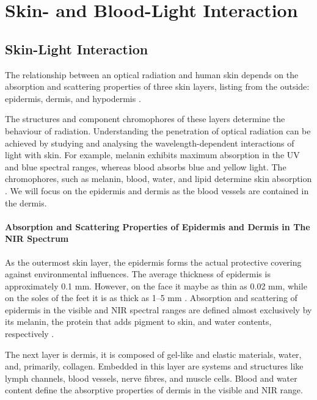 
\chapter{Skin- and Blood-Light Interaction}\label{chapter:Skin- and Blood-Light Interaction}


\section{Skin-Light Interaction}

The relationship between an optical radiation and human skin depends
on the absorption and scattering properties of three skin layers, listing from the outside: epidermis, dermis, and hypodermis \parencite{skin}.
 
The structures and component chromophores of these layers determine the behaviour of radiation. Understanding the penetration of optical radiation can be achieved by studying and analysing the wavelength-dependent interactions of light with skin. For example, melanin exhibits maximum absorption in the UV and blue spectral
ranges, whereas blood absorbs blue and yellow light. The chromophores, such as melanin, blood, water, and lipid determine skin absorption \parencite{skin1}.
We will focus on the epidermis and dermis as the blood vessels are contained in the dermis.

\subsubsection{Absorption and Scattering Properties of Epidermis and Dermis in The NIR Spectrum}

As the outermost skin layer, the epidermis forms the actual protective covering against environmental influences. The average thickness of epidermis is approximately 0.1 mm. However, on the face it maybe as thin as 0.02 mm, while on the soles of the feet it is as thick as 1–5 mm \parencite{skin1}. Absorption and scattering of epidermis in the visible and NIR spectral ranges are defined almost exclusively by its melanin, the protein that adds pigment to skin, and water contents, respectively \parencite{skin1}.

The next layer is dermis, it is composed of gel-like and elastic materials, water, and, primarily, collagen. Embedded in this layer are systems and structures like lymph channels, blood vessels, nerve fibres, and muscle cells. Blood and water content define the absorptive properties of dermis in the visible and NIR range\parencite{skin1}.

